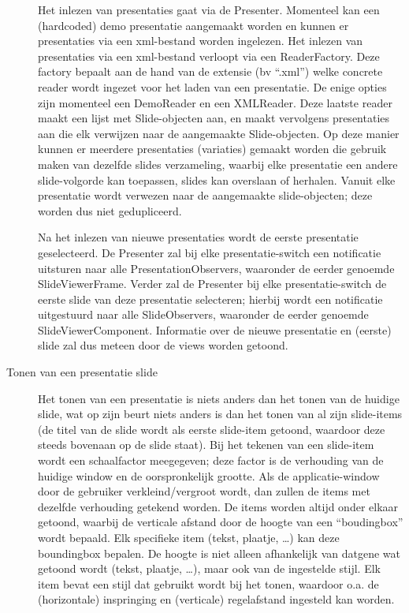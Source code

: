 \documentclass[a4paper]{article}
\begin{document}
\begin{description}
Het inlezen van presentaties gaat via de Presenter. Momenteel kan een (hardcoded) demo presentatie aangemaakt worden en kunnen er presentaties via een xml-bestand worden ingelezen. Het inlezen van presentaties via een xml-bestand verloopt via een ReaderFactory. Deze factory bepaalt aan de hand van de extensie (bv “.xml”) welke concrete reader wordt ingezet voor het laden van een presentatie. De enige opties zijn momenteel een DemoReader en een XMLReader. Deze laatste reader maakt een lijst met Slide-objecten aan, en maakt vervolgens presentaties aan die elk verwijzen naar de aangemaakte Slide-objecten. Op deze manier kunnen er meerdere presentaties (variaties) gemaakt worden die gebruik maken van dezelfde slides verzameling, waarbij elke presentatie een andere slide-volgorde kan toepassen, slides kan overslaan of herhalen. Vanuit elke presentatie wordt verwezen naar de aangemaakte slide-objecten; deze worden dus niet gedupliceerd.

Na het inlezen van nieuwe presentaties wordt de eerste presentatie geselecteerd. De Presenter zal bij elke presentatie-switch een notificatie uitsturen naar alle PresentationObservers, waaronder de eerder genoemde SlideViewerFrame. Verder zal de Presenter bij elke presentatie-switch de eerste slide van deze presentatie selecteren; hierbij wordt een notificatie uitgestuurd naar alle SlideObservers, waaronder de eerder genoemde SlideViewerComponent. Informatie over de nieuwe presentatie en (eerste) slide zal dus meteen door de views worden getoond.
\item[Tonen van een presentatie slide]
Het tonen van een presentatie is niets anders dan het tonen van de huidige slide, wat op zijn beurt niets anders is dan het tonen van al zijn slide-items (de titel van de slide wordt als eerste slide-item getoond, waardoor deze steeds bovenaan op de slide staat). Bij het tekenen van een slide-item wordt een schaalfactor meegegeven; deze factor is de verhouding van de huidige window en de oorspronkelijk grootte. Als de applicatie-window door de gebruiker verkleind/vergroot wordt, dan zullen de items met dezelfde verhouding getekend worden.
De items worden altijd onder elkaar getoond, waarbij de verticale afstand door de hoogte van een “boudingbox” wordt bepaald. Elk specifieke item (tekst, plaatje, …) kan deze boundingbox bepalen. De hoogte is niet alleen afhankelijk van datgene wat getoond wordt (tekst, plaatje, …), maar ook van de ingestelde stijl. Elk item bevat een stijl dat gebruikt wordt bij het tonen, waardoor o.a. de (horizontale) inspringing en (verticale) regelafstand ingesteld kan worden.
\end{description}
\end{document}
